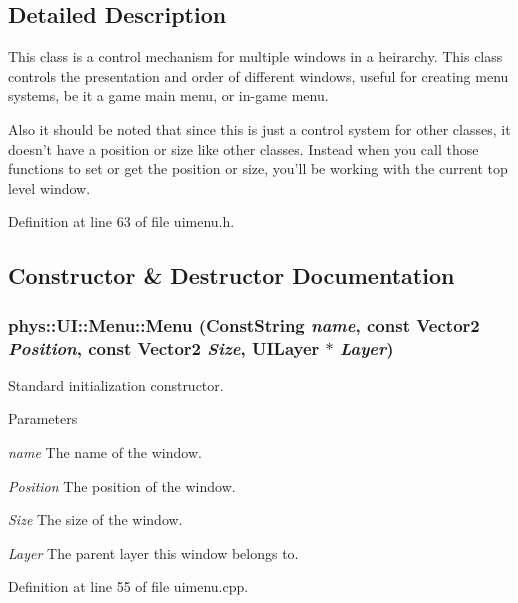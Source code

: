 \subsection{Detailed Description}
This class is a control mechanism for multiple windows in a heirarchy. This class controls the presentation and order of different windows, useful for creating menu systems, be it a game main menu, or in-\/game menu. \par
 \par
 Also it should be noted that since this is just a control system for other classes, it doesn't have a position or size like other classes. Instead when you call those functions to set or get the position or size, you'll be working with the current top level window. 

Definition at line 63 of file uimenu.h.



\subsection{Constructor \& Destructor Documentation}
\hypertarget{classphys_1_1UI_1_1Menu_af7dfd6dd92b4477cdc4df7ed4bf5499c}{
\subsubsection[{Menu}]{\setlength{\rightskip}{0pt plus 5cm}phys::UI::Menu::Menu ({\bf ConstString} {\em name}, \/  const {\bf Vector2} {\em Position}, \/  const {\bf Vector2} {\em Size}, \/  {\bf UILayer} $\ast$ {\em Layer})}}
\label{d6/dd3/classphys_1_1UI_1_1Menu_af7dfd6dd92b4477cdc4df7ed4bf5499c}


Standard initialization constructor. 


\begin{DoxyParams}{Parameters}
\item[{\em name}]The name of the window. \item[{\em Position}]The position of the window. \item[{\em Size}]The size of the window. \item[{\em Layer}]The parent layer this window belongs to. \end{DoxyParams}


Definition at line 55 of file uimenu.cpp.



